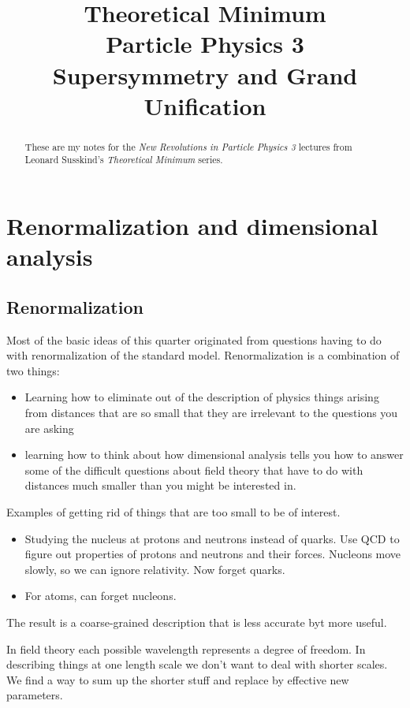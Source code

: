 \documentclass[]{article}
\title{Theoretical Minimum\\Particle Physics 3\\Supersymmetry and Grand Unification}
\author{}
\begin{document}
\maketitle

\begin{abstract}
	These are my notes for the \emph{New Revolutions in Particle Physics 3} lectures from Leonard Susskind's \emph{Theoretical Minimum} series\cite{susskind2010supersymmetry}.
\end{abstract}

\tableofcontents
\listoffigures
\listoftables
\listoftheorems

\section{Renormalization  and dimensional analysis}

\subsection{Renormalization}

Most of the basic ideas of this quarter originated from questions having to do with renormalization of the standard model. Renormalization is a combination of two things:
\begin{itemize}
	\item Learning how to eliminate out of the description of physics things arising from distances that are so small that they are irrelevant to the questions you are asking
	\item learning how to think about how dimensional analysis tells you how to answer some of the difficult questions about field theory that have to do with distances much smaller than you might be interested in.
\end{itemize}

Examples of getting rid of things that are too small to be of interest.
\begin{itemize}
	\item Studying the nucleus at protons and neutrons instead of quarks. Use QCD to figure out properties of protons and neutrons and their forces. Nucleons move slowly, so we can ignore relativity. Now forget quarks.
	\item For atoms, can forget nucleons.
\end{itemize}

The result is a coarse-grained description that is less accurate byt more useful.

In field theory each possible wavelength represents a degree of freedom. In describing things at one length scale we don't want to deal with shorter scales. We find a way to sum up the shorter stuff and replace by effective new parameters.
\end{document}
